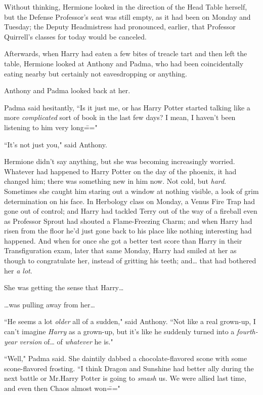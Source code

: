 Without thinking, Hermione looked in the direction of the Head Table herself, but the Defense Professor's seat was still empty, as it had been on Monday and Tuesday; the Deputy Headmistress had pronounced, earlier, that Professor Quirrell's classes for today would be canceled.

Afterwards, when Harry had eaten a few bites of treacle tart and then left the table, Hermione looked at Anthony and Padma, who had been coincidentally eating nearby but certainly not eavesdropping or anything.

Anthony and Padma looked back at her.

Padma said hesitantly, ``Is it just me, or has Harry Potter started talking like a more \emph{complicated} sort of book in the last few days? I mean, I haven't been listening to him very long\==="

``It's not just you," said Anthony.

Hermione didn't say anything, but she was becoming increasingly worried. Whatever had happened to Harry Potter on the day of the phoenix, it had changed him; there was something new in him now. Not cold, but \emph{hard}. Sometimes she caught him staring out a window at nothing visible, a look of grim determination on his face. In Herbology class on Monday, a Venus Fire Trap had gone out of control; and Harry had tackled Terry out of the way of a fireball even as Professor Sprout had shouted a Flame-Freezing Charm; and when Harry had risen from the floor he'd just gone back to his place like nothing interesting had happened. And when for once she got a better test score than Harry in their Transfiguration exam, later that same Monday, Harry had smiled at her as though to congratulate her, instead of gritting his teeth; and{\ldots} that had bothered her \emph{a lot}.

She was getting the sense that Harry{\ldots}

{\ldots}was pulling away from her{\ldots}

``He seems a lot \emph{older} all of a sudden," said Anthony. ``Not like a real grown-up, I can't imagine \emph{Harry} as a grown-up, but it's like he suddenly turned into a \emph{fourth-year version} of{\ldots} of \emph{whatever} he is."

``Well," Padma said. She daintily dabbed a chocolate-flavored scone with some scone-flavored frosting. ``I think Dragon and Sunshine had better ally during the next battle or Mr.\?Harry Potter is going to \emph{smash} us. We were allied last time, and even then Chaos almost won\==="

